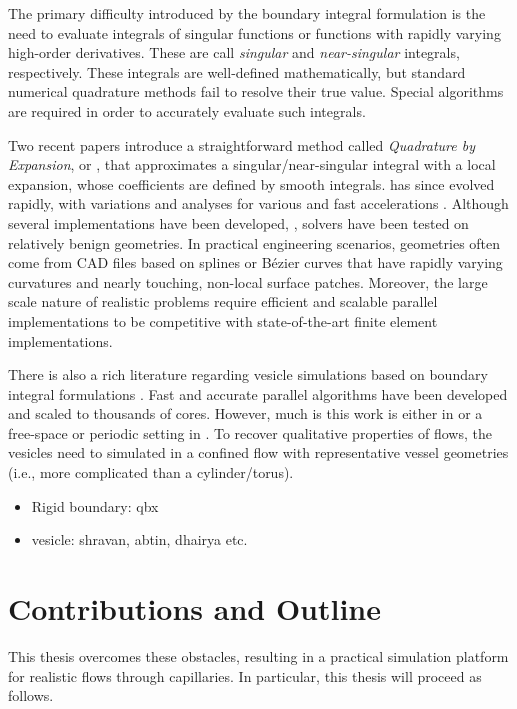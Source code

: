 The primary difficulty introduced by the boundary integral formulation is the need to evaluate integrals of singular functions or functions with rapidly varying high-order derivatives. These are call \textit{singular} and \textit{near-singular} integrals, respectively.
These integrals are well-defined mathematically, but standard numerical quadrature methods fail to resolve their true value.
Special algorithms are required in order to accurately evaluate such integrals.

Two recent papers \cite{barnett2014evaluation,KBGO} introduce a straightforward method called \textit{Quadrature by Expansion}, or \qbx, that approximates a singular/near-singular integral with a local expansion, whose coefficients are defined by smooth integrals.
\qbx has since evolved rapidly, with variations \cite{ST,aT1,RBZ,af2016fast} and analyses \cite{EGK,aT2,klinteberg2020quadrature} for various \pdes and fast accelerations \cite{RKO,wala20193d,wala2019optimization,wala2020approximation}.
Although several \threed implementations have been developed, \cite{ST, wala2019optimization,wala2020approximation, wala20193d}, \threed solvers have been tested on relatively benign geometries.
In practical engineering scenarios, geometries often come from CAD files based on splines or B\'ezier curves that have rapidly varying curvatures and nearly touching, non-local surface patches.
Moreover, the large scale nature of realistic problems require efficient and scalable parallel implementations to be competitive with state-of-the-art finite element implementations.

There is also a rich literature regarding vesicle simulations based on boundary integral formulations .
Fast and accurate parallel algorithms have been developed and scaled to thousands of cores. 
However, much is this work is either in \twod {} or a free-space or periodic setting in \threed.
To recover qualitative properties of \rbc flows, the vesicles need to simulated in a confined flow with representative vessel geometries (i.e., more complicated than a cylinder/torus).
\begin{itemize}
    \item Rigid boundary: qbx
    \item vesicle: shravan, abtin, dhairya etc.
\end{itemize}

\section{Contributions and Outline}
This thesis overcomes these obstacles, resulting in a practical simulation platform for realistic \rbc flows through capillaries.
In particular, this thesis will proceed as follows.

